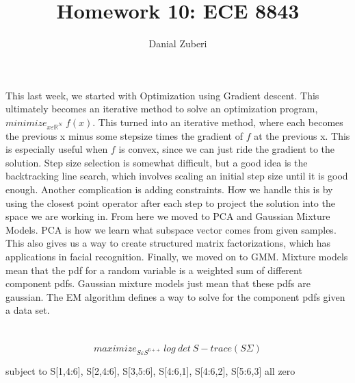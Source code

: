 \documentclass[]{article}
\title{Homework 10: ECE 8843}
\author{Danial Zuberi}
\begin{document}
\maketitle
\section{}
\begin{text}
\indent This last week, we started with Optimization using Gradient descent. This ultimately becomes an iterative method to solve an optimization program, \newline $minimize_{x\varepsilon \mathbb{R}^N}\;f(x)$. This turned into an iterative method, where each becomes the previous x minus some stepsize times the gradient of $f$ at the previous x. This is especially useful when $f$ is convex, since we can just ride the gradient to the solution. Step size selection is somewhat difficult, but a good idea is the backtracking line search, which involves scaling an initial step size until it is good enough. Another complication is adding constraints. How we handle this is by using the closest point operator after each step to project the solution into the space we are working in.
\newline
\indent  From here we moved to PCA and Gaussian Mixture Models. PCA is how we learn what subspace vector comes from given samples. This also gives us a way to create structured matrix factorizations, which has applications in facial recognition. 
\newline \indent
Finally, we moved on to GMM. Mixture models mean that the pdf for a random variable is a weighted sum of different component pdfs. Gaussian mixture models just mean that these pdfs are gaussian. The EM algorithm defines a way to solve for the component pdfs given a data set.
\end{text}


\section{}
\subsection{}
\begin{equation}
maximize_{S\varepsilon S^{6++}}\; log\:det\:S - trace(S\Sigma)
\end{equation}
\begin{flushleft}
subject to S[1,4:6], S[2,4:6], S[3,5:6], S[4:6,1], S[4:6,2], S[5:6,3] all zero	
\end{flushleft}
\end{document}
